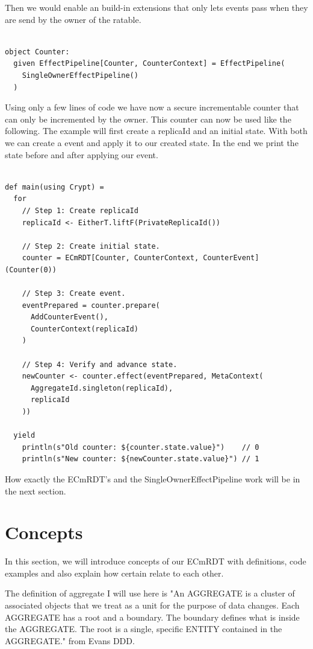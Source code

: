 \documentclass[
	ngerman,
	ruledheaders=section,   %
	class=report,		    %
	thesis={type=bachelor}, %
	accentcolor=9c,			%
	custommargins=true,    %
	marginpar=false,        %
	parskip=half-,          %
	fontsize=11pt,          %
]{tudapub}
\begin{document}
Then we would enable an build-in extensions that only lets events pass when they are send by the owner of the ratable.

\begin{lstlisting}

object Counter:
  given EffectPipeline[Counter, CounterContext] = EffectPipeline(
    SingleOwnerEffectPipeline()
  )

\end{lstlisting}

Using only a few lines of code we have now a secure incrementable counter that can only be incremented by the owner. This counter can now be used like the following. The example will first create a replicaId and an initial state. With both we can create a event and apply it to our created state. In the end we print the state before and after applying our event.

\begin{lstlisting}
    
def main(using Crypt) = 
  for
    // Step 1: Create replicaId
    replicaId <- EitherT.liftF(PrivateReplicaId())

    // Step 2: Create initial state.
    counter = ECmRDT[Counter, CounterContext, CounterEvent](Counter(0))

    // Step 3: Create event.
    eventPrepared = counter.prepare(
      AddCounterEvent(),
      CounterContext(replicaId)
    )

    // Step 4: Verify and advance state.
    newCounter <- counter.effect(eventPrepared, MetaContext(
      AggregateId.singleton(replicaId), 
      replicaId
    ))

  yield
    println(s"Old counter: ${counter.state.value}")    // 0
    println(s"New counter: ${newCounter.state.value}") // 1

\end{lstlisting}

How exactly the ECmRDT's and the SingleOwnerEffectPipeline work will be in the next section.

\section{Concepts}

In this section, we will introduce concepts of our ECmRDT with definitions, code examples and also explain how certain relate to each other.

The definition of aggregate I will use here is "An AGGREGATE is a cluster of associated objects that we treat as a unit for the purpose of data changes. Each AGGREGATE has a root and a boundary. The boundary defines what is inside the AGGREGATE. The root is a single, specific ENTITY contained in the AGGREGATE." from Evans DDD.
\end{document}
